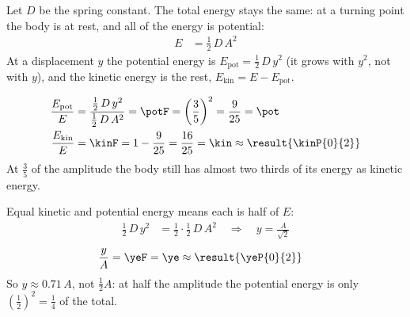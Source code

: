 Let $D$ be the spring constant. The total energy stays the same: at a turning point the body is at rest, and all of the energy is potential:
\begin{align}
 E &= \tfrac12\,D\,A^2
\end{align}
At a displacement $y$ the potential energy is $E_\mathrm{pot} = \tfrac12\,D\,y^2$ (it grows with $y^2$, not with $y$), and the kinetic energy is the rest, $E_\mathrm{kin} = E - E_\mathrm{pot}$.

\begin{abcliste}
\abc
\begin{align}
 \frac{E_\mathrm{pot}}{E} &= \frac{\tfrac12\,D\,y^2}{\tfrac12\,D\,A^2} = \potF = \left(\frac{3}{5}\right)^2 = \frac{9}{25} = \pot \\
 \frac{E_\mathrm{kin}}{E} &= \kinF = 1-\frac{9}{25} = \frac{16}{25} = \kin \approx \result{\kinP{0}{2}}
\end{align}
At $\frac35$ of the amplitude the body still has almost two thirds of its energy as kinetic energy.

\abc
Equal kinetic and potential energy means each is half of $E$:
\begin{align}
 \tfrac12\,D\,y^2 &= \tfrac12\cdot\tfrac12\,D\,A^2 \quad\Rightarrow\quad y = \frac{A}{\sqrt2}
\end{align}
\begin{align}
 \frac{y}{A} &= \yeF = \ye \approx \result{\yeP{0}{2}}
\end{align}
So $y \approx 0.71\,A$, not $\frac12 A$: at half the amplitude the potential energy is only $\left(\frac12\right)^2 = \frac14$ of the total.
\end{abcliste}
